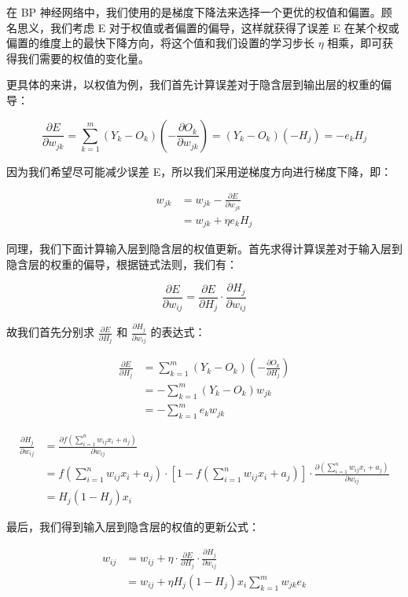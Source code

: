 在 BP 神经网络中，我们使用的是梯度下降法来选择一个更优的权值和偏置。顾名思义，我们考虑 E 对于权值或者偏置的偏导，这样就获得了误差 E 在某个权或偏置的维度上的最快下降方向，将这个值和我们设置的学习步长 $\eta$ 相乘，即可获得我们需要的权值的变化量。

更具体的来讲，以权值为例，我们首先计算误差对于隐含层到输出层的权重的偏导：

$$\frac{\partial E}{\partial w_{jk}}=\sum_{k=1}^m(Y_k - O_k)(-\frac{\partial O_k}{\partial w_{jk}})=(Y_k-O_k)(-H_j)=-e_kH_j$$

因为我们希望尽可能减少误差 E，所以我们采用逆梯度方向进行梯度下降，即：

$$
\begin{aligned}
    w_{jk}&=w_{jk}-\frac{\partial E}{\partial w_{jk}}\\
    &=w_{jk}+\eta e_kH_j
\end{aligned}
$$

同理，我们下面计算输入层到隐含层的权值更新。首先求得计算误差对于输入层到隐含层的权重的偏导，根据链式法则，我们有：

$$\frac{\partial E}{\partial w_{ij}}=\frac{\partial E}{\partial H_j}\cdot\frac{\partial H_j}{\partial w_{ij}}$$

故我们首先分别求 $\frac{\partial E}{\partial H_j}$ 和 $\frac{\partial H_j}{\partial w_{ij}}$ 的表达式：

$$
\begin{aligned}
    \frac{\partial E}{\partial{H_j}} &= \sum_{k=1}^m(Y_k - O_k)(-\frac{\partial O_k}{\partial H_j})\\
    &=-\sum_{k=1}^m(Y_k - O_k)w_{jk}\\
    &=-\sum_{k=1}^me_kw_{jk}
\end{aligned}
$$

$$
\begin{aligned}
    \frac{\partial H_j}{\partial w_{ij}}&=\frac{\partial f(\sum_{i=1}^nw_{ij}x_i+a_j)}{\partial w_{ij}}\\
    &=f(\sum_{i=1}^nw_{ij}x_i+a_j)\cdot[1-f(\sum_{i=1}^nw_{ij}x_i+a_j)]\cdot\frac{\partial(\sum_{i=1}^nw_{ij}x_i+a_j)}{\partial w_{ij}}\\
    &=H_j(1-H_j)x_i
\end{aligned}
$$

最后，我们得到输入层到隐含层的权值的更新公式：

$$
\begin{aligned}
    w_{ij}&=w_{ij}+\eta\cdot\frac{\partial E}{\partial{H_j}}\cdot\frac{\partial H_j}{\partial w_{ij}}\\
    &=w_{ij}+\eta H_j(1-H_j)x_i\sum_{k=1}^mw_{jk}e_k
\end{aligned}
$$


